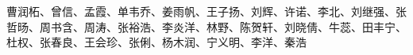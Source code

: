 \documentclass[11pt]{book} %
\begin{document}
\newpage
~\vfill
\thispagestyle{empty}

{\large
{} \\

\noindent 曹润柘、曾信、孟霞、单韦乔、姜雨帆、王子扬、刘辉、许诺、李北、刘继强、张哲旸、周书含、周涛、张裕浩、李炎洋、林野、陈贺轩、刘晓倩、牛蕊、田丰宁、杜权、张春良、王会珍、张俐、杨木润、宁义明、李洋、秦浩 \\
}

\newpage


{} %
\pagestyle{empty} %
\tableofcontents %
\cleardoublepage %
\pagestyle{fancy} %













\cleardoublepage %
\printbibliography


\cleardoublepage %
\printindex %


\end{document}
